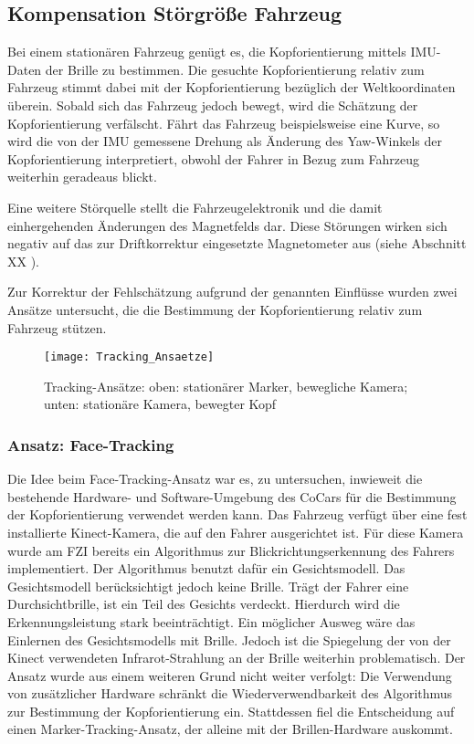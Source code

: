 
\subsection{Kompensation Störgröße Fahrzeug}

Bei einem stationären Fahrzeug genügt es, die Kopforientierung mittels \acs{IMU}-Daten der Brille zu bestimmen. Die gesuchte Kopforientierung relativ zum Fahrzeug stimmt dabei mit der Kopforientierung bezüglich der Weltkoordinaten überein. Sobald sich das Fahrzeug jedoch bewegt, wird die Schätzung der Kopforientierung verfälscht. Fährt das Fahrzeug beispielsweise eine Kurve, so wird die von der IMU gemessene Drehung als Änderung des Yaw-Winkels der Kopforientierung interpretiert, obwohl der Fahrer in Bezug zum Fahrzeug weiterhin geradeaus blickt.

Eine weitere Störquelle stellt die Fahrzeugelektronik und die damit einhergehenden Änderungen des Magnetfelds dar. Diese Störungen wirken sich negativ auf das zur Driftkorrektur eingesetzte Magnetometer aus (siehe Abschnitt XX ).

Zur Korrektur der Fehlschätzung aufgrund der genannten Einflüsse wurden zwei Ansätze untersucht, die die Bestimmung der Kopforientierung relativ zum Fahrzeug stützen.

\begin{figure}[h]
  \centering
  \texttt{[image: Tracking\_Ansaetze]}
  \caption{Tracking-Ansätze: oben: stationärer Marker, bewegliche Kamera; unten: stationäre Kamera, bewegter Kopf}
  \label{fig:tracking_ansaetze}
\end{figure}

\subsubsection{Ansatz: Face-Tracking}
Die Idee beim Face-Tracking-Ansatz war es, zu untersuchen, inwieweit die bestehende Hardware- und Software-Umgebung des CoCars für die Bestimmung der Kopforientierung verwendet werden kann. Das Fahrzeug verfügt über eine fest installierte Kinect-Kamera, die auf den Fahrer ausgerichtet ist. Für diese Kamera wurde am FZI bereits ein Algorithmus zur Blickrichtungserkennung des Fahrers implementiert. Der Algorithmus benutzt dafür ein Gesichtsmodell. Das Gesichtsmodell berücksichtigt jedoch keine Brille. Trägt der Fahrer eine Durchsichtbrille, ist ein Teil des Gesichts verdeckt. Hierdurch wird die Erkennungsleistung stark beeinträchtigt. Ein möglicher Ausweg wäre das Einlernen des Gesichtsmodells mit Brille. Jedoch ist die Spiegelung der von der Kinect verwendeten Infrarot-Strahlung an der Brille weiterhin problematisch. Der Ansatz wurde aus einem weiteren Grund nicht weiter verfolgt: Die Verwendung von zusätzlicher Hardware schränkt die Wiederverwendbarkeit des Algorithmus zur Bestimmung der Kopforientierung ein. Stattdessen fiel die Entscheidung auf einen Marker-Tracking-Ansatz, der alleine mit der Brillen-Hardware auskommt.

